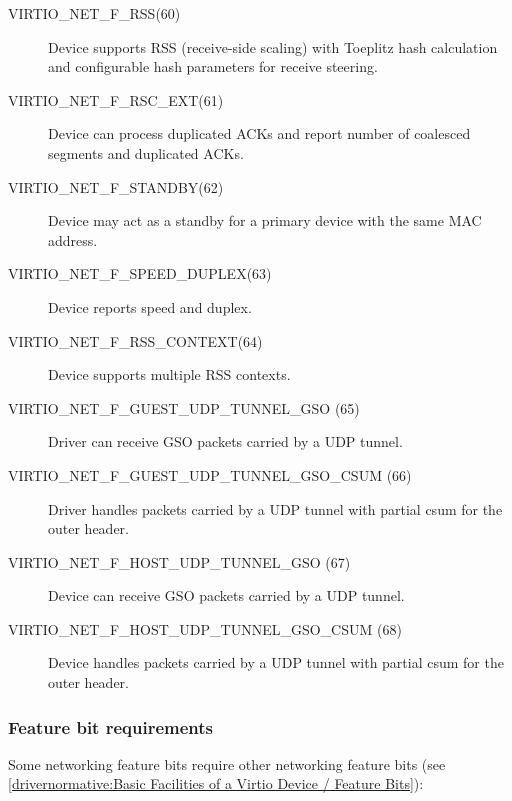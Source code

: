 \begin{description}
\item[VIRTIO_NET_F_RSS(60)] Device supports RSS (receive-side scaling)
    with Toeplitz hash calculation and configurable hash
    parameters for receive steering.

\item[VIRTIO_NET_F_RSC_EXT(61)] Device can process duplicated ACKs
    and report number of coalesced segments and duplicated ACKs.

\item[VIRTIO_NET_F_STANDBY(62)] Device may act as a standby for a primary
    device with the same MAC address.

\item[VIRTIO_NET_F_SPEED_DUPLEX(63)] Device reports speed and duplex.

\item[VIRTIO_NET_F_RSS_CONTEXT(64)] Device supports multiple RSS contexts.

\item[VIRTIO_NET_F_GUEST_UDP_TUNNEL_GSO (65)] Driver can receive GSO packets
  carried by a UDP tunnel.

\item[VIRTIO_NET_F_GUEST_UDP_TUNNEL_GSO_CSUM (66)] Driver handles packets
  carried by a UDP tunnel with partial csum for the outer header.

\item[VIRTIO_NET_F_HOST_UDP_TUNNEL_GSO (67)] Device can receive GSO packets
  carried by a UDP tunnel.

\item[VIRTIO_NET_F_HOST_UDP_TUNNEL_GSO_CSUM (68)] Device handles packets
  carried by a UDP tunnel with partial csum for the outer header.
\end{description}

\subsubsection{Feature bit requirements}\label{sec:Device Types / Network Device / Feature bits / Feature bit requirements}

Some networking feature bits require other networking feature bits
(see \ref{drivernormative:Basic Facilities of a Virtio Device / Feature Bits}):

